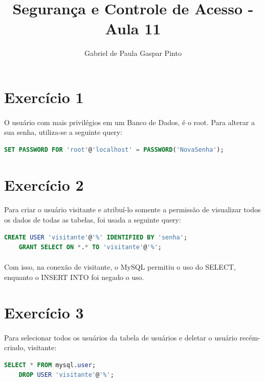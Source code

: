 \documentclass{article}
\title{Segurança e Controle de Acesso - Aula 11}
\author{Gabriel de Paula Gaspar Pinto}
\date{}
\begin{document}
\maketitle

\section*{Exercício 1}
\paragraph{} O usuário com mais privilégios em um Banco de Dados, é o root. Para alterar a sua senha, utiliza-se a seguinte query:

\begin{lstlisting}[language=SQL]
    SET PASSWORD FOR 'root'@'localhost' = PASSWORD('NovaSenha');
\end{lstlisting}

\section*{Exercício 2}
\paragraph{} Para criar o usuário visitante e atribuí-lo somente a permissão de visualizar todos os dados de todas as tabelas, foi usada a seguinte query:

\begin{lstlisting}[language=SQL]
    CREATE USER 'visitante'@'%' IDENTIFIED BY 'senha';
    GRANT SELECT ON *.* TO 'visitante'@'%';
\end{lstlisting}

\paragraph{} Com isso, na conexão de visitante, o MySQL permitiu o uso do SELECT, enquanto o INSERT INTO foi negado o uso.

\section*{Exercício 3}
\paragraph{} Para selecionar todos os usuários da tabela de usuários e deletar o usuário recém-criado, visitante:

\begin{lstlisting}[language=SQL]
    SELECT * FROM mysql.user;
    DROP USER 'visitante'@'%';
\end{lstlisting}
\end{document}
